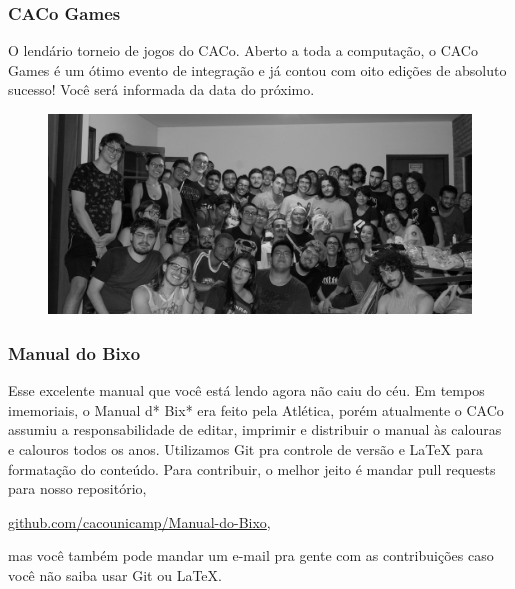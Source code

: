 \subsubsection{CACo Games}

O lendário torneio de jogos do CACo. Aberto a toda a computação, o CACo Games é 
um ótimo evento de integração e já contou com oito edições de absoluto sucesso! 
Você será informada da data do próximo.

\begin{figure}[H]
  \centering
  \includegraphics[width=.45\textwidth]{img/alem_da_graduacao/caco_games.jpg}
\end{figure}

\subsubsection{Manual do Bixo}

Esse excelente manual que você está lendo agora não caiu do céu. Em tempos
imemoriais, o Manual d* Bix* era feito pela Atlética, porém atualmente o CACo
assumiu a responsabilidade de editar, imprimir e distribuir o manual às
calouras e calouros todos os anos. Utilizamos Git pra controle de versão e
{\LaTeX} para formatação do conteúdo. Para contribuir, o melhor jeito é mandar
pull requests para nosso repositório,
\begin{center}
\url{github.com/cacounicamp/Manual-do-Bixo},\\
\end{center}
mas você também pode mandar um e-mail pra gen\-te com as contribuições caso
você não saiba usar Git ou \LaTeX.
